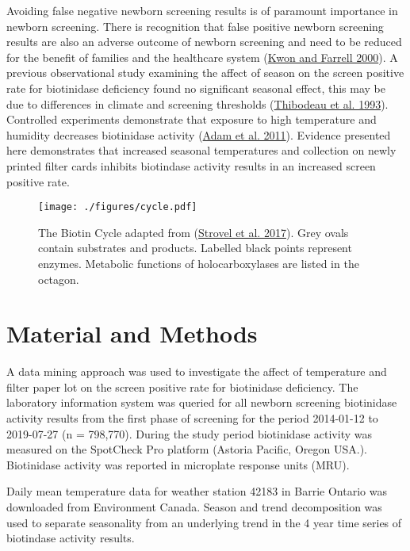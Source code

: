 \documentclass[review]{elsarticle}
\begin{document}
Avoiding false negative newborn screening results is of paramount
importance in newborn screening. There is recognition that false
positive newborn screening results are also an adverse outcome of
newborn screening and need to be reduced for the benefit of families
and the healthcare system (\hyperlink{citeproc_bib_item_4}{Kwon and Farrell 2000}). A previous observational
study examining the affect of season on the screen positive rate for
biotinidase deficiency found no significant seasonal effect, this may
be due to differences in climate and screening thresholds (\hyperlink{citeproc_bib_item_9}{Thibodeau et al. 1993}). Controlled experiments demonstrate that
exposure to high temperature and humidity decreases biotinidase
activity (\hyperlink{citeproc_bib_item_1}{Adam et al. 2011}). Evidence presented here demonstrates that
increased seasonal temperatures and collection on newly printed filter
cards inhibits biotindase activity results in an increased screen
positive rate.



\begin{figure}[htbp]
\centering
\texttt{[image: ./figures/cycle.pdf]}
\caption{\label{fig:org3908b43}The Biotin Cycle adapted from (\hyperlink{citeproc_bib_item_7}{Strovel et al. 2017}). Grey ovals contain substrates and products. Labelled black points represent enzymes. Metabolic functions of holocarboxylases are listed in the octagon.}
\end{figure}

\section*{Material and Methods}
\label{sec:org92bcc06}
A data mining approach was used to investigate the affect of
temperature and filter paper lot on the screen positive rate for
biotinidase deficiency. The laboratory information system was queried
for all newborn screening biotinidase activity results from the first
phase of screening for the period 2014-01-12 to 2019-07-27 (n =
798,770). During the study period biotinidase activity was measured on
the SpotCheck Pro platform (Astoria Pacific, Oregon USA.). Biotinidase
activity was reported in microplate response units (MRU).

Daily mean temperature data for weather station 42183 in Barrie
Ontario was downloaded from Environment Canada. Season and trend
decomposition was used to separate seasonality from an underlying
trend in the 4 year time series of biotindase activity results.
\end{document}
